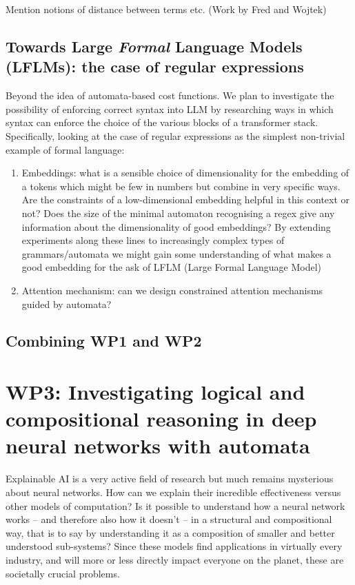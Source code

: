 \documentclass[11pt,a4paper]{article}
\begin{document}
			Mention notions of distance between terms etc. (Work by Fred and Wojtek)
			
		\subsection{Towards Large \emph{Formal} Language Models (LFLMs): the case of regular expressions}
			Beyond the idea of automata-based cost functions. We plan to investigate the possibility of enforcing correct syntax into LLM by researching ways in which syntax can enforce the choice of the various blocks of a transformer stack. Specifically, looking at the case of regular expressions as the simplest non-trivial example of formal language: 
			\begin{enumerate}
				\item Embeddings: what is a sensible choice of dimensionality for the embedding of a tokens which might be few in numbers but combine in very specific ways. Are the constraints of a low-dimensional embedding helpful in this context or not? Does the size of the minimal automaton recognising a regex give any information about the dimensionality of good embeddings? By extending experiments along these lines to increasingly complex types of grammars/automata we might gain some understanding of what makes a good embedding for the ask of LFLM (Large Formal Language Model)
				\item Attention mechanism: can we design constrained attention mechanisms guided by automata?
			\end{enumerate}
		
		\subsection{Combining WP1 and WP2}
	
	\section*{WP3: Investigating logical and compositional reasoning in deep neural networks with automata}
	Explainable AI is a very active field of research but much remains mysterious about neural networks. How can we explain their incredible effectiveness versus other models of computation? Is it possible to understand how a neural network works -- and therefore also how it doesn't -- in a structural and compositional way, that is to say by understanding it as a composition of smaller and better understood sub-systems? Since these models find applications in virtually every industry, and will more or less directly impact everyone on the planet, these are societally crucial problems. 
	
\end{document}
